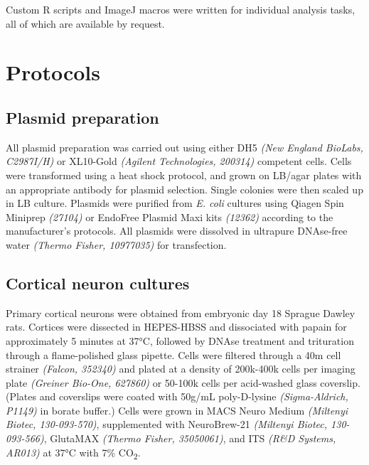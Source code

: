 \documentclass[
  12pt,
  a4paper,
]{book}
\begin{document}
Custom R scripts and ImageJ macros were written for individual analysis tasks, all of which are available by request.

\hypertarget{protocols}{%
\section{Protocols}\label{protocols}}

\hypertarget{plasmid-prep}{%
\subsection{Plasmid preparation}\label{plasmid-prep}}

All plasmid preparation was carried out using either DH5\textalpha{} \emph{(New England BioLabs, C2987I/H)} or XL10-Gold \emph{(Agilent Technologies, 200314)} competent cells. Cells were transformed using a heat shock protocol, and grown on LB/agar plates with an appropriate antibody for plasmid selection. Single colonies were then scaled up in LB culture. Plasmids were purified from \emph{E. coli} cultures using Qiagen Spin Miniprep \emph{(27104)} or EndoFree Plasmid Maxi kits \emph{(12362)} according to the manufacturer's protocols. All plasmids were dissolved in ultrapure DNAse-free water \emph{(Thermo Fisher, 10977035)} for transfection.

\hypertarget{cortical-neuron-cultures}{%
\subsection{Cortical neuron cultures}\label{cortical-neuron-cultures}}

Primary cortical neurons were obtained from embryonic day 18 Sprague Dawley rats. Cortices were dissected in HEPES-HBSS and dissociated with papain for approximately 5 minutes at 37°C, followed by DNAse treatment and trituration through a flame-polished glass pipette. Cells were filtered through a 40\textmu{}m cell strainer \emph{(Falcon, 352340)} and plated at a density of 200k-400k cells per imaging plate \emph{(Greiner Bio-One, 627860)} or 50-100k cells per acid-washed glass coverslip. (Plates and coverslips were coated with 50\textmu{}g/mL poly-D-lysine \emph{(Sigma-Aldrich, P1149)} in borate buffer.) Cells were grown in MACS Neuro Medium \emph{(Miltenyi Biotec, 130-093-570)}, supplemented with NeuroBrew-21 \emph{(Miltenyi Biotec, 130-093-566)}, GlutaMAX \emph{(Thermo Fisher, 35050061)}, and ITS \emph{(R\&D Systems, AR013)} at 37°C with 7\% CO\textsubscript{2}.
\end{document}
